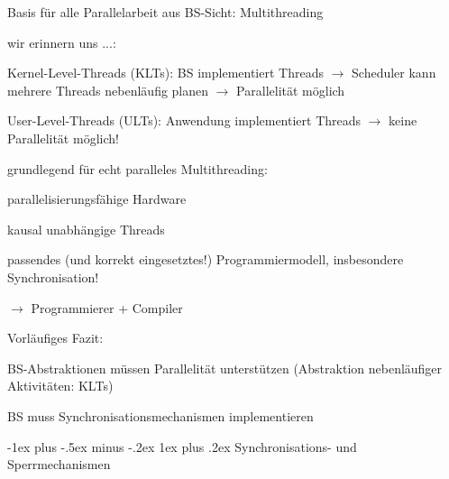 \documentclass[a4paper]{article}
\makeatletter
\renewcommand{\subsubsection}{\@startsection{subsubsection}{3}{0mm}%
 {-1ex plus -.5ex minus -.2ex}%
 {1ex plus .2ex}%
 {\normalfont\small\bfseries}}
\makeatother
\begin{document}
\begin{multicols}{3}
    \begin{itemize*}
        \item
        Basis für alle Parallelarbeit aus BS-Sicht: Multithreading
        \item
        wir erinnern uns ...:
        \begin{itemize*}
            \item Kernel-Level-Threads (KLTs): BS implementiert Threads $\rightarrow$  Scheduler kann mehrere Threads nebenläufig planen $\rightarrow$  Parallelität möglich
            \item User-Level-Threads (ULTs): Anwendung implementiert Threads $\rightarrow$  keine Parallelität möglich!
        \end{itemize*}
        \item
        grundlegend für echt paralleles Multithreading:
        \begin{itemize*}
            \item parallelisierungsfähige Hardware
            \item kausal unabhängige Threads
            \item passendes (und korrekt eingesetztes!) Programmiermodell, insbesondere Synchronisation!
            \item $\rightarrow$  Programmierer + Compiler
        \end{itemize*}
    \end{itemize*}

    Vorläufiges Fazit:

    \begin{itemize*}
        \item
        BS-Abstraktionen müssen Parallelität unterstützen (Abstraktion
        nebenläufiger Aktivitäten: KLTs)
        \item
        BS muss Synchronisationsmechanismen implementieren
    \end{itemize*}


    \subsubsection{Synchronisations- und
        Sperrmechanismen}


\end{multicols}
\end{document}
